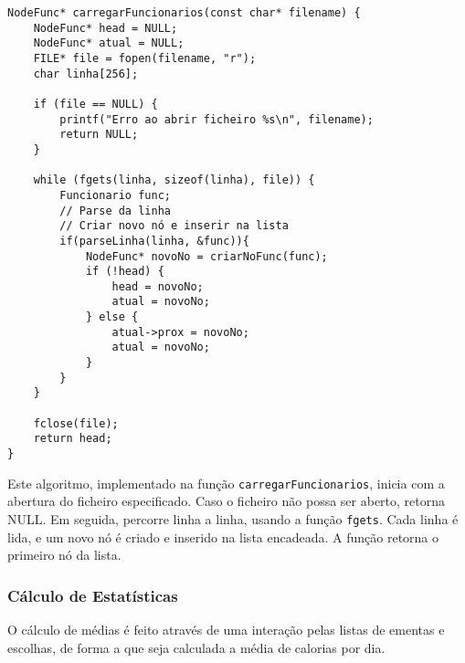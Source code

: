 \documentclass[a4paper,12pt]{report}
\begin{document}
\begin{lstlisting}[caption={Algoritmo de carregamento de dados},label=lst:carregar]
NodeFunc* carregarFuncionarios(const char* filename) {
    NodeFunc* head = NULL;
    NodeFunc* atual = NULL;
    FILE* file = fopen(filename, "r");
    char linha[256];
    
    if (file == NULL) {
        printf("Erro ao abrir ficheiro %s\n", filename);
        return NULL;
    }
    
    while (fgets(linha, sizeof(linha), file)) {
        Funcionario func;
        // Parse da linha
        // Criar novo nó e inserir na lista
        if(parseLinha(linha, &func)){
            NodeFunc* novoNo = criarNoFunc(func);
            if (!head) {
                head = novoNo;
                atual = novoNo;
            } else {
                atual->prox = novoNo;
                atual = novoNo;
            }
        }
    }
    
    fclose(file);
    return head;
}
\end{lstlisting}
Este algoritmo, implementado na função \texttt{carregarFuncionarios}, inicia com a abertura do ficheiro especificado. Caso o ficheiro não possa ser aberto, retorna NULL. Em seguida, percorre linha a linha, usando a função \texttt{fgets}. Cada linha é lida, e um novo nó é criado e inserido na lista encadeada. A função retorna o primeiro nó da lista.

\subsubsection{Cálculo de Estatísticas}
O cálculo de médias é feito através de uma interação pelas listas de ementas e escolhas, de forma a que seja calculada a média de calorias por dia.
\end{document}
